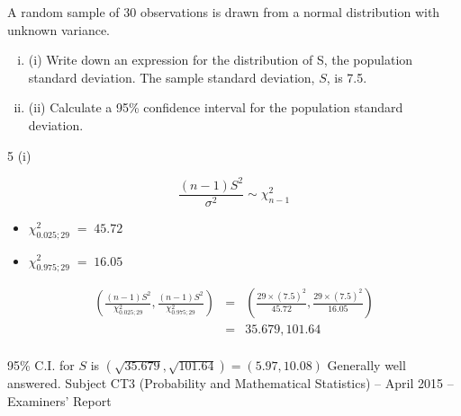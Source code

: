\documentclass[a4paper,12pt]{article}
\begin{document}
\large
\noindent A random sample of 30 observations is drawn from a normal distribution with unknown variance.
\begin{enumerate}[(i)]
\item (i) Write down an expression for the distribution of S, the population standard deviation. 
The sample standard deviation, $S$, is 7.5.
\item (ii) Calculate a 95\% confidence interval for the population standard deviation. 
\end{enumerate}




5 (i)


\[ \frac{(n-1)S^2}{\sigma^2} \sim \chi^2_{n-1} \]

\begin{itemize}

\item  ${ \displaystyle  \chi^2_{0.025;29 }  \;=\; 45.72}$

\item  ${ \displaystyle  \chi^2_{0.975;29} \;=\; 16.05 }$

\end{itemize}

\begin{eqnarray*} 
\left( \frac{(n-1)S^2}{\chi^2_{0.025;29 }}, \frac{(n-1)S^2}{\chi^2_{0.975;29 }} \right) 
&=& \left( \frac{29 \times (7.5)^2}{45.72}, \frac{29 \times (7.5)^2}{16.05} \right)\\
&=& 35.679,101.64\\
\end{eqnarray*}


95\% C.I. for $S$ is  $( \sqrt{35.679}, \sqrt{101.64} )  =(5.97,10.08)$
Generally well answered.
Subject CT3 (Probability and Mathematical Statistics) – April 2015 – Examiners’ Report
\end{document}
